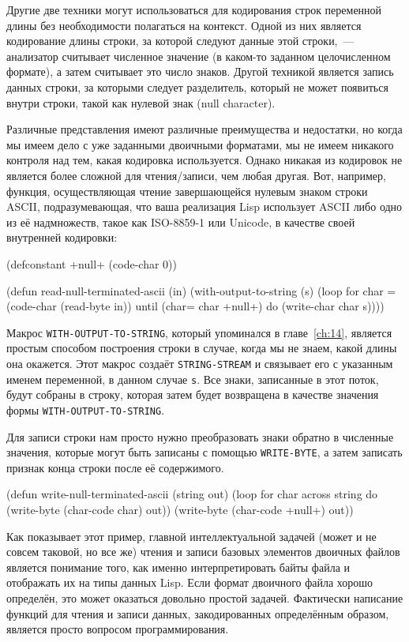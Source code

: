 Другие две техники могут использоваться для кодирования строк переменной длины без
необходимости полагаться на контекст. Одной из них является кодирование длины строки, за
которой следуют данные этой строки,~--- анализатор считывает численное значение (в каком-то
заданном целочисленном формате), а затем считывает это число знаков. Другой техникой
является запись данных строки, за которыми следует разделитель, который не может появиться
внутри строки, такой как нулевой знак (null character).

Различные представления имеют различные преимущества и недостатки, но когда мы имеем дело
с уже заданными двоичными форматами, мы не имеем никакого контроля над тем, какая
кодировка используется. Однако никакая из кодировок не является более сложной для
чтения/записи, чем любая другая. Вот, например, функция, осуществляющая чтение
завершающейся нулевым знаком строки ASCII, под\-ра\-зуме\-ваю\-щая, что ваша реализация Lisp
использует ASCII либо одно из её надмножеств, такое как ISO-8859-1 или Unicode, в качестве
своей внутренней кодировки:

\begin{myverb}
(defconstant +null+ (code-char 0))

(defun read-null-terminated-ascii (in)
  (with-output-to-string (s)
    (loop for char = (code-char (read-byte in))
          until (char= char +null+) do (write-char char s))))
\end{myverb}

Макрос \lstinline{WITH-OUTPUT-TO-STRING}, который упоминался в главе~\ref{ch:14}, является
простым способом построения строки в случае, когда мы не знаем, какой длины она
окажется. Этот макрос создаёт \lstinline{STRING-STREAM} и связывает его с указанным именем
переменной, в данном случае \lstinline{s}. Все знаки, записанные в этот поток, будут собраны в
строку, которая затем будет возвращена в качестве значения формы
\lstinline{WITH-OUTPUT-TO-STRING}.

Для записи строки нам просто нужно преобразовать знаки обратно в численные значения,
которые могут быть записаны с помощью \lstinline{WRITE-BYTE}, а затем записать признак конца
строки после её содержимого.

\begin{myverb}
(defun write-null-terminated-ascii (string out)
  (loop for char across string
        do (write-byte (char-code char) out))
  (write-byte (char-code +null+) out))
\end{myverb}

Как показывает этот пример, главной интеллектуальной задачей (может и не совсем таковой,
но все же) чтения и записи базовых элементов двоичных файлов является понимание того, как
именно интерпретировать байты файла и отображать их на типы данных Lisp. Если формат
двоичного файла хорошо определён, это может оказаться довольно простой задачей. Фактически
написание функций для чтения и записи данных, закодированных определённым образом,
является просто вопросом программирования.

